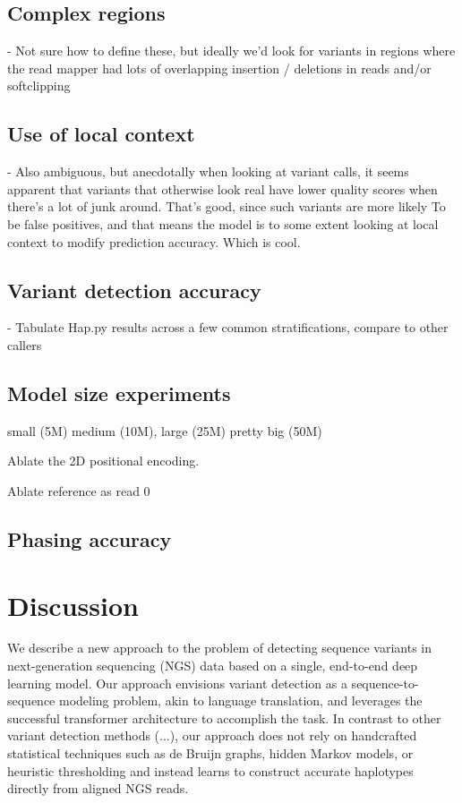 \documentclass[]{article}
\begin{document}
\subsection{Complex regions}
 - Not sure how to define these, but ideally we'd look for variants in regions where the read mapper had
 lots of overlapping insertion / deletions in reads and/or softclipping

\subsection{Use of local context}
 - Also ambiguous, but anecdotally when looking at variant calls, it seems apparent that variants that otherwise look real have lower quality scores when there's a lot of junk around. That's good, since such variants are more likely To
 be false positives, and that means the model is to some extent looking at local context to modify prediction accuracy. Which is cool. 


\subsection{Variant detection accuracy}

 - Tabulate Hap.py results across a few common stratifications, compare to other callers




\subsection{Model size experiments}

 small (5M) medium (10M), large (25M) pretty big (50M)

 
 Ablate the 2D positional encoding.

 Ablate reference as read 0 
 
 \subsection{Phasing accuracy}



 \section{Discussion}

We describe a new approach to the problem of detecting sequence variants in next-generation sequencing (NGS) data based on a single, end-to-end deep learning model. Our approach envisions variant detection as a sequence-to-sequence modeling problem, akin to language translation, and leverages the successful transformer architecture to accomplish the task. In contrast to other variant detection methods (...), our approach does not rely on handcrafted statistical techniques such as de Bruijn graphs, hidden Markov models, or heuristic thresholding and instead learns to construct accurate haplotypes directly from aligned NGS reads. 
 
\end{document}
